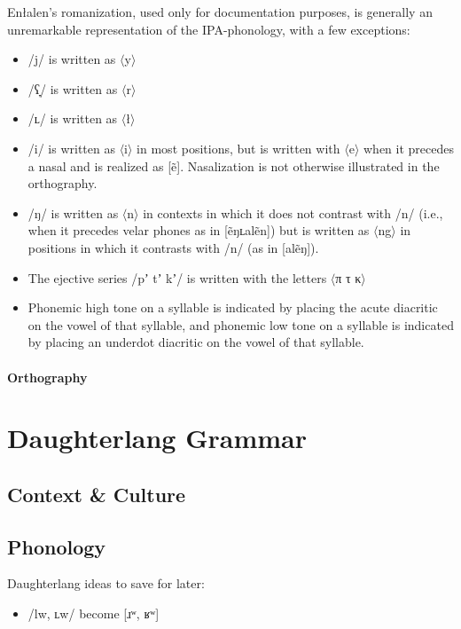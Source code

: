 \documentclass[a4paper,11pt,oneside,openany]{memoir}
\newcommand{\ortho}[1]{$\langle$#1$\rangle$}
\newcommand{\bripa}[1]{[#1]}
\newcommand{\phipa}[1]{/#1/}
\newcommand{\enl}[1]{}
\newcommand{\ppa}{π}
\newcommand{\tta}{τ}
\newcommand{\kka}{κ}
\newcommand{\engga}{ng}
\newcommand{\alvr}{ɹ}
\newcommand{\engma}{ŋ}
\newcommand{\vell}{ʟ}
\newcommand{\velr}{ʁ}
\newcommand{\pharox}{ʕ}
\newcommand{\lab}{ʷ}
\newcommand{\jekt}{ʼ}
\newcommand{\dwnwrd}{̞}
\newcommand{\childlangone}{Daughterlang}
\begin{document}
Enłalen's romanization, used only for documentation purposes, is generally an unremarkable representation of the IPA-phonology, with a few exceptions:
\begin{itemize}
    \item \phipa{j} is written as \ortho{y}
    \item \phipa{\pharox\dwnwrd} is written as \ortho{r}
    \item \phipa{\vell} is written as \ortho{ł}
    \item \phipa{i} is written as \ortho{i} in most positions, but is written with \ortho{e} when it precedes a nasal and is realized as \bripa{ẽ}. Nasalization is not otherwise illustrated in the orthography.
    \item \phipa{\engma} is written as \ortho{n} in contexts in which it does not contrast with \phipa{n} (i.e., when it precedes velar phones as in \enl{enłalen} \bripa{ẽŋ\vell alẽn}) but is written as \ortho{\engga} in positions in which it contrasts with \phipa{n} (as in \enl{ale\engga} \bripa{alẽ\engma}).
    \item The ejective series \phipa{p\jekt{} t\jekt{} k\jekt{}} is written with the letters \ortho{\ppa{} \tta{} \kka{}}
    \item Phonemic high tone on a syllable is indicated by placing the acute diacritic on the vowel of that syllable, and phonemic low tone on a syllable is indicated by placing an underdot diacritic on the vowel of that syllable.
\end{itemize}

\subsection{Orthography}

\part{\childlangone{} Grammar}

\chapter{Context \& Culture}

\chapter{Phonology}

Daughterlang ideas to save for later:

\begin{itemize}
    \item \phipa{lw, \vell w} become \bripa{\alvr\lab, \velr\lab}
\end{itemize}
\end{document}
